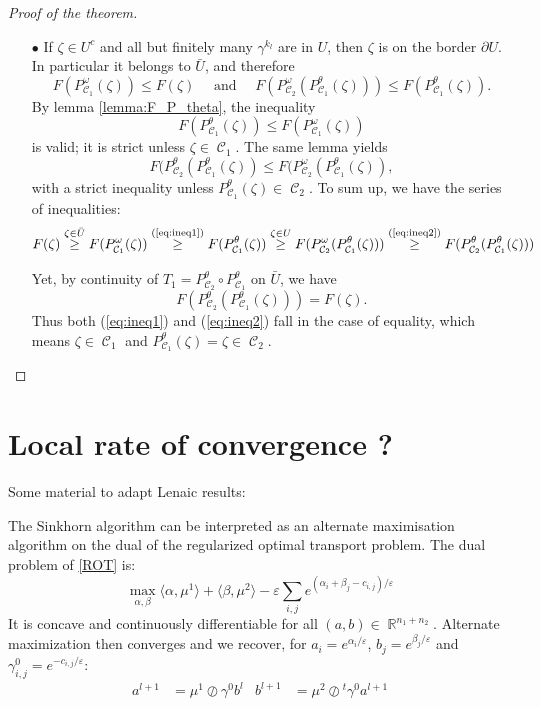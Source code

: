 \documentclass{article} %
\DeclareMathOperator{\IR}{\mathbb{R}}
\DeclareMathOperator{\Ccal}{\mathcal{C}}
\renewcommand{\epsilon}{\varepsilon}
\theoremstyle{plain}
\theoremstyle{definition}
\theoremstyle{remark}
\begin{document}
\begin{proof}[Proof of the theorem]
\begin{enumerate}[align=right,labelsep=10pt,leftmargin=0.5cm]
		 \item[$\bullet$] If $\zeta \in U^c$ and all but finitely many $\gamma^{k_l}$ are in $U$, then $\zeta$ is on the border $\partial U$. In particular it belongs to $\bar{U}$, and therefore
		 \[
		 F(P^\omega_{\Ccal_1}(\zeta)) \le F(\zeta) \quad
		 \text{ and } \quad
		 F(P^\omega_{\Ccal_2}(P^\theta_{\Ccal_1}(\zeta))) \le F(P^\theta_{\Ccal_1}(\zeta)).
		 \]
		 By lemma \ref{lemma:F_P_theta}, the inequality \begin{equation} \label{eq:ineq1}
		 F(P_{\Ccal_1}^\theta(\zeta)) \le F(P_{\Ccal_1}^\omega(\zeta)) \end{equation}
		 is valid; it is strict unless $\zeta \in \Ccal_1$.
		 The same lemma yields
		 \begin{equation} \label{eq:ineq2}
		 F(P_{\Ccal_2}^\theta(P_{\Ccal_1}^\theta(\zeta)) \le F(P_{\Ccal_2}^\omega(P_{\Ccal_1}^\theta(\zeta)), \end{equation}
		 with a strict inequality unless $P_{\Ccal_1}^\theta(\zeta) \in \Ccal_2$.
		 To sum up, we have the series of inequalities:
		 \[
		 F(\zeta) 
		 \overset{\zeta \in \bar{U}}{\ge}
		 F(P^\omega_{\Ccal_1}(\zeta))
		 \overset{\text{(\ref{eq:ineq1})}}{\ge}
		 F(P^\theta_{\Ccal_1}(\zeta))
		 \overset{\zeta \in U}{\ge}
		 F(P_{\Ccal_2}^\omega(P_{\Ccal_1}^\theta(\zeta)))
		 \overset{\text{(\ref{eq:ineq2})}}{\ge}
		 F(P_{\Ccal_2}^\theta(P_{\Ccal_1}^\theta(\zeta)))
		 \]
		 
		 Yet, by continuity of $T_1 = P_{\Ccal_2}^\theta \circ P_{\Ccal_1}^\theta $ on $\bar{U}$, we have
		 \[
		 F(P_{\Ccal_2}^\theta(P_{\Ccal_1}^\theta(\zeta))) = F(\zeta).
		 \]
		 Thus both (\ref{eq:ineq1}) and (\ref{eq:ineq2}) fall in the case of equality, which means $\zeta \in \Ccal_1$ and $P^\theta_{\Ccal_1}(\zeta) = \zeta \in \Ccal_2$.
	\end{enumerate}
\end{proof}


\section{Local rate of convergence ?}
Some material to adapt Lenaic results:


The Sinkhorn algorithm can be interpreted as an alternate maximisation algorithm on the dual of the regularized optimal transport problem.
The dual problem of \eqref{ROT} is:
\begin{equation}\label{DROT}\max_{\alpha,\beta}\langle \alpha,\mu^1\rangle+\langle \beta,\mu^2\rangle-\epsilon\sum_{i,j}e^{(\alpha_i+\beta_j-c_{i,j})/\epsilon}\end{equation}
It is concave and continuously differentiable for all $(a,b)\in\IR^{n_1+n_2}$. Alternate maximization then converges and we recover, for $a_i=e^{\alpha_i/\epsilon}$, $b_j=e^{\beta_j/\epsilon}$ and $\gamma^0_{i,j}=e^{-c_{i,j}/\epsilon}$:
\begin{align*}
a^{l+1} &= {\mu^1}\oslash{\gamma^0 b^l} &
b^{l+1} &= {\mu^2}\oslash{^t \gamma^0 a^{l+1}} 
\end{align*}
\end{document}
